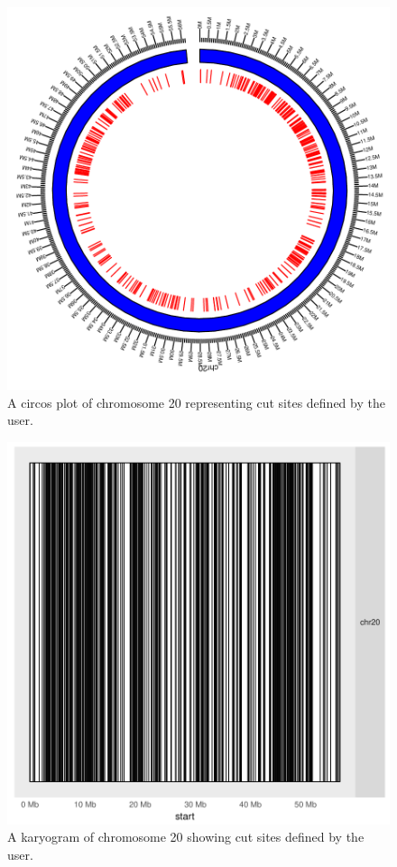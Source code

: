 \documentclass{article}
\begin{document}
\begin{figure}
\begin{center}
\includegraphics{msgbsR_Vignette-fig2}
\end{center}
\caption{A circos plot of chromosome 20 representing cut sites defined by the user.}
\label{fig:fig2}
\end{figure}

\clearpage


\begin{figure}
\begin{center}
\includegraphics{msgbsR_Vignette-fig3}
\end{center}
\caption{A karyogram of chromosome 20 showing cut sites defined by the user.}
\label{fig:fig3}
\end{figure}
\end{document}
